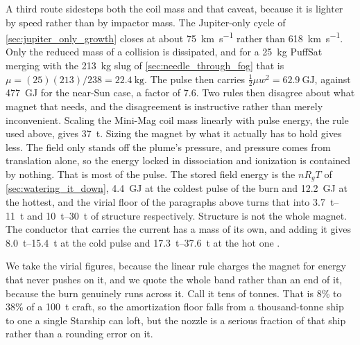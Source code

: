 \documentclass{article}
\begin{document}
A third route sidesteps both the coil mass and that caveat, because it is lighter by speed rather than by impactor mass. The Jupiter-only cycle of \autoref{sec:jupiter_only_growth} closes at about \SI{75}{\kilo\meter\per\second} rather than \SI{618}{\kilo\meter\per\second}. Only the reduced mass of a collision is dissipated, and for a \SI{25}{\kilo\gram} PuffSat merging with the \SI{213}{\kilo\gram} slug of \autoref{sec:needle_through_fog} that is $\mu = (25)(213)/238 = \SI{22.4}{\kilo\gram}$. The pulse then carries $\tfrac{1}{2}\mu w^2 = \SI{62.9}{\giga\joule}$, against \SI{477}{\giga\joule} for the near-Sun case, a factor of \num{7.6}. Two rules then disagree about what magnet that needs, and the disagreement is instructive rather than merely inconvenient. Scaling the Mini-Mag coil mass linearly with pulse energy, the rule used above, gives \SI{37}{\tonne}. Sizing the magnet by what it actually has to hold gives less. The field only stands off the plume's pressure, and pressure comes from translation alone, so the energy locked in dissociation and ionization is contained by nothing. That is most of the pulse. The stored field energy is the $nR_gT$ of \autoref{sec:watering_it_down}, \SI{4.4}{\giga\joule} at the coldest pulse of the burn and \SI{12.2}{\giga\joule} at the hottest, and the virial floor of the paragraphs above turns that into \SIrange[range-phrase={--},range-units=single]{3.7}{11}{\tonne} and \SIrange[range-phrase={--},range-units=single]{10}{30}{\tonne} of structure respectively. Structure is not the whole magnet. The conductor that carries the current has a mass of its own, and adding it gives \SIrange{8.0}{15.4}{\tonne} at the cold pulse and \SIrange{17.3}{37.6}{\tonne} at the hot one \cite{Katz_aim_is_all_you_need_2025}.

We take the virial figures, because the linear rule charges the magnet for energy that never pushes on it, and we quote the whole band rather than an end of it, because the burn genuinely runs across it. Call it tens of tonnes. That is 8\% to 38\% of a \SI{100}{\tonne} craft, so the amortization floor falls from a thousand-tonne ship to one a single Starship can loft, but the nozzle is a serious fraction of that ship rather than a rounding error on it.
\end{document}
